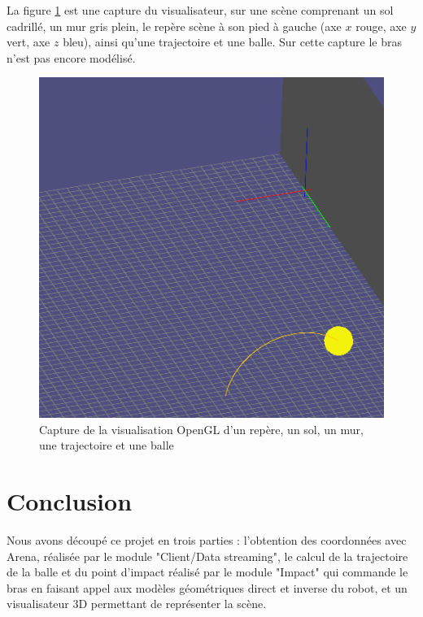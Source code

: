 \documentclass{article}[11pt]
\begin{document}
La figure \ref{viewer} est une capture du visualisateur, sur une scène comprenant un sol cadrillé, un mur gris plein, le repère scène à son pied à gauche (axe $x$ rouge, axe $y$ vert, axe $z$ bleu), ainsi qu'une trajectoire et une balle. Sur cette capture le bras n'est pas encore modélisé.
\begin{figure}[!htc]
	\begin{center}
		\includegraphics[scale=0.5]{images/viewer.png}
		\caption{Capture de la visualisation OpenGL d'un repère, un sol, un mur, une trajectoire et une balle} 
		\label{viewer}
	\end{center}
\end{figure}



\section{Conclusion}

Nous avons découpé ce projet en trois parties : l'obtention des coordonnées avec Arena, réalisée par le module "Client/Data streaming", le calcul de la trajectoire de la balle et du point d'impact réalisé par le module "Impact" qui commande le bras en faisant appel aux modèles géométriques direct et inverse du robot, et un visualisateur 3D permettant de représenter la scène. \\
\end{document}
